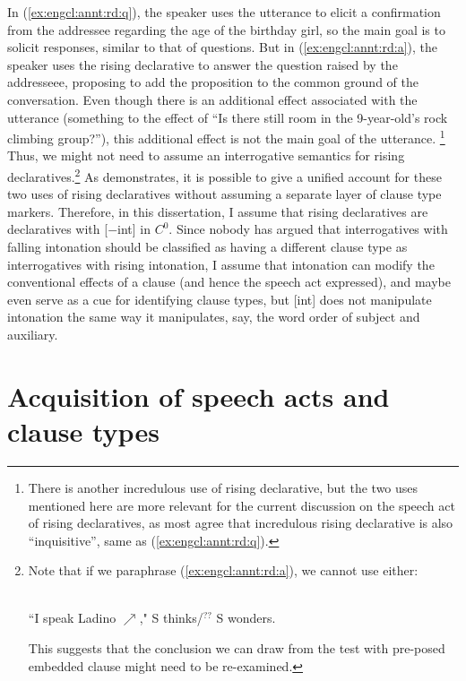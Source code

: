 In (\ref{ex:engcl:annt:rd:q}), the speaker uses the utterance to elicit a confirmation from the addressee regarding the age of the birthday girl, so the main goal is to solicit responses, similar to that of questions. But in (\ref{ex:engcl:annt:rd:a}), the speaker uses the rising declarative to answer the question raised by the addresseee, proposing to add the proposition  to the common ground of the conversation. Even though there is an additional effect associated with the utterance (something to the effect of ``Is there still room in the 9-year-old’s rock climbing group?''), this additional effect is not the main goal of the utterance. \footnote{There is another incredulous use of rising declarative, but the two uses mentioned here are more relevant for the current discussion on the speech act of rising declaratives, as most agree that incredulous rising declarative is also ``inquisitive'', same as (\ref{ex:engcl:annt:rd:q}).} Thus, we might not need to assume an interrogative semantics for rising declaratives.\footnote{Note that if we paraphrase (\ref{ex:engcl:annt:rd:a}), we cannot use  either:

\\
``I speak Ladino $\nearrow$," S thinks/$^{??}$ S wonders.
\eex
 
This suggests that the conclusion we can draw from the test with pre-posed embedded clause might need to be re-examined.}  As \textcite{goodhue2021rd} demonstrates, it is possible to give a unified account for these two uses of rising declaratives without assuming a separate layer of clause type markers. Therefore, in this dissertation, I assume that rising declaratives are declaratives with [$-$int] in $C^{0}$. Since nobody has argued that interrogatives with falling intonation should be classified as having a different clause type as interrogatives with rising intonation, I assume that intonation can modify the conventional effects of a clause (and hence the speech act expressed), and maybe even serve as a cue for identifying clause types, but [\textpm int] does not manipulate intonation the same way it manipulates, say, the word order of subject and auxiliary.



\section{Acquisition of speech acts and clause types}
\label{sec:bg:acq}
